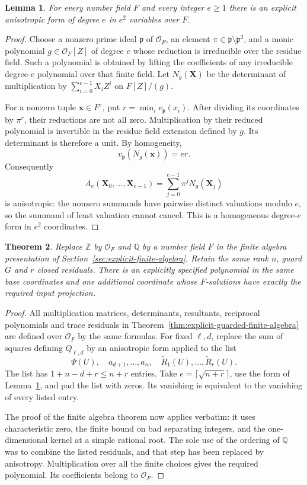 \documentclass[11pt,a4paper]{article}
\newtheorem{theorem}{Theorem}[section]
\newtheorem{lemma}[theorem]{Lemma}
\theoremstyle{definition}
\theoremstyle{remark}
\begin{document}
\begin{lemma}\label{fa:anisotropic}
For every number field $F$ and every integer $e\ge1$ there is an
explicit anisotropic form of degree $e$ in $e^2$ variables over $F$.
\end{lemma}
\begin{proof}
Choose a nonzero prime ideal $\mathfrak p$ of $\mathcal O_F$, an
element $\pi\in\mathfrak p\setminus\mathfrak p^2$, and a monic
polynomial $g\in\mathcal O_F[Z]$ of degree $e$ whose reduction is
irreducible over the residue field. Such a polynomial is obtained
by lifting the coefficients of any irreducible degree-$e$ polynomial
over that finite field. Let $N_g(\mathbf X)$ be the determinant of
multiplication by $\sum_{i=0}^{e-1}X_iZ^i$ on $F[Z]/(g)$.

For a nonzero tuple $\mathbf x\in F^e$, put
$r=\min_i v_{\mathfrak p}(x_i)$. After dividing its coordinates
by $\pi^r$, their reductions are not all zero. Multiplication by
their reduced polynomial is invertible in the residue field
extension defined by $g$. Its determinant is therefore a unit.
By homogeneity,
\[
                 v_{\mathfrak p}(N_g(\mathbf x))=er.
\]
Consequently
\[
 A_e(\mathbf X_0,\ldots,\mathbf X_{e-1})
       =\sum_{j=0}^{e-1}\pi^jN_g(\mathbf X_j)
\]
is anisotropic: the nonzero summands have pairwise distinct
valuations modulo $e$, so the summand of least valuation cannot
cancel. This is a homogeneous degree-$e$ form in $e^2$ coordinates.
\end{proof}

\begin{theorem}\label{fa:number-field}
Replace $\mathbb Z$ by $\mathcal O_F$ and $\mathbb Q$ by a
number field $F$ in the finite algebra presentation of
Section~\ref{sec:explicit-finite-algebra}. Retain the same rank $n$,
guard $G$ and $r$ closed residuals. There is an explicitly specified
polynomial in the same base coordinates and one additional coordinate
whose $F$-solutions have exactly the required input projection.
\end{theorem}
\begin{proof}
All multiplication matrices, determinants, resultants, reciprocal
polynomials and trace residuals in
Theorem~\ref{thm:explicit-guarded-finite-algebra} are defined over
$\mathcal O_F$ by the same formulas. For fixed $\ell,d$, replace
the sum of squares defining $Q_{\ell,d}$ by an anisotropic form
applied to the list
\[
 \Psi(U),\quad a_{d+1},\ldots,a_n,\quad
 \widetilde R_1(U),\ldots,\widetilde R_r(U).
\]
The list has $1+n-d+r\le n+r$ entries. Take
$e=\lceil\sqrt{n+r}\rceil$, use the form of
Lemma~\ref{fa:anisotropic}, and pad the list with zeros.
Its vanishing is equivalent to the vanishing of every listed entry.

The proof of the finite algebra theorem now applies verbatim:
it uses characteristic zero, the finite bound on bad separating
integers, and the one-dimensional kernel at a simple rational root.
The sole use of the ordering of $\mathbb Q$ was to combine the
listed residuals, and that step has been replaced by anisotropy.
Multiplication over all the finite choices gives the required
polynomial. Its coefficients belong to $\mathcal O_F$.
\end{proof}
\end{document}
